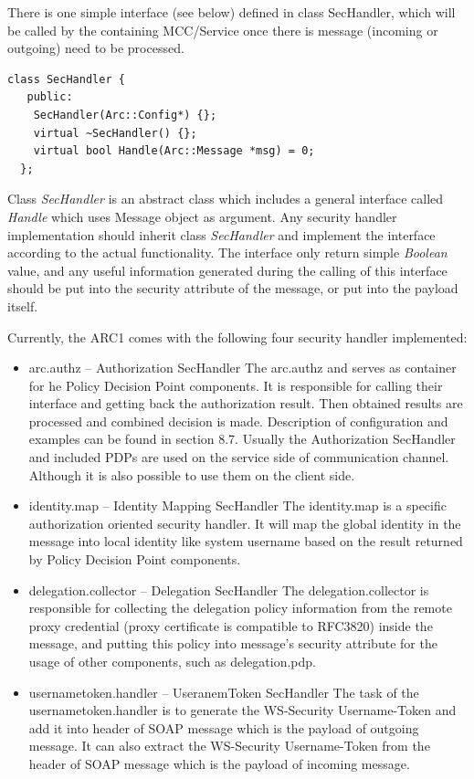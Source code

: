 \documentclass{article}                            %
\begin{document}
There is one simple interface (see below) defined in class SecHandler, which will be called by the containing MCC/Service once there is message (incoming or outgoing) need to be processed.

\begin{verbatim}
class SecHandler {
   public:
    SecHandler(Arc::Config*) {};
    virtual ~SecHandler() {};
    virtual bool Handle(Arc::Message *msg) = 0;
  };
\end{verbatim}

Class \textit{SecHandler} is an abstract class which includes a general interface called \textit{Handle} which uses Message object as argument. Any security handler implementation should inherit class \textit{SecHandler} and implement the interface according to the actual functionality. The interface only return simple \textit{Boolean} value, and any useful information generated during the calling of this interface should be put into the security attribute of the message, or put into the payload itself.

Currently, the ARC1 comes with the following four security handler implemented:

\begin{itemize}
    \item arc.authz – Authorization SecHandler
The arc.authz and serves as container for he Policy Decision Point components. It is responsible for calling their interface and getting back the authorization result. Then obtained results are processed and   combined decision is made. Description of configuration and examples can be found in section 8.7. Usually the Authorization SecHandler and included PDPs are used on the service side of communication channel. Although it is also possible to use them on the client side.

    \item identity.map – Identity Mapping SecHandler
The identity.map is a specific authorization oriented security handler. It will map the global identity in the message into local identity like system username based on the result returned by Policy Decision Point components.

    \item delegation.collector – Delegation SecHandler
The delegation.collector is responsible for collecting the delegation policy information from the remote proxy credential (proxy certificate is compatible to RFC3820) inside the message, and putting this policy into message’s security attribute for the usage of other components, such as  delegation.pdp.

    \item usernametoken.handler – UseranemToken SecHandler
The task of the  usernametoken.handler is to generate the WS-Security Username-Token and add it into header of SOAP message which is the payload of outgoing message. It can also extract the WS-Security Username-Token from the header of SOAP message which is the payload of incoming message.

\end{itemize}
\end{document}
